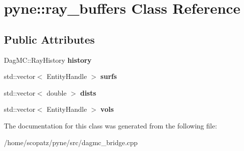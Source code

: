\hypertarget{classpyne_1_1ray__buffers}{\section{pyne\-:\-:ray\-\_\-buffers Class Reference}
\label{classpyne_1_1ray__buffers}
}
\subsection*{Public Attributes}
\begin{DoxyCompactItemize}
\item 
\hypertarget{classpyne_1_1ray__buffers_adb3331dbf290b1c6d44c37931a917a7e}{Dag\-M\-C\-::\-Ray\-History {\bfseries history}}\label{classpyne_1_1ray__buffers_adb3331dbf290b1c6d44c37931a917a7e}

\item 
\hypertarget{classpyne_1_1ray__buffers_ac2a784c86703f7253861ceaa73ba5e6b}{std\-::vector$<$ Entity\-Handle $>$ {\bfseries surfs}}\label{classpyne_1_1ray__buffers_ac2a784c86703f7253861ceaa73ba5e6b}

\item 
\hypertarget{classpyne_1_1ray__buffers_a2904cd95dd5c1cb04ca796cf025bced1}{std\-::vector$<$ double $>$ {\bfseries dists}}\label{classpyne_1_1ray__buffers_a2904cd95dd5c1cb04ca796cf025bced1}

\item 
\hypertarget{classpyne_1_1ray__buffers_a2d059fcf9432e03b28eade60308b2498}{std\-::vector$<$ Entity\-Handle $>$ {\bfseries vols}}\label{classpyne_1_1ray__buffers_a2d059fcf9432e03b28eade60308b2498}

\end{DoxyCompactItemize}


The documentation for this class was generated from the following file\-:\begin{DoxyCompactItemize}
\item 
/home/scopatz/pyne/src/dagmc\-\_\-bridge.\-cpp\end{DoxyCompactItemize}
